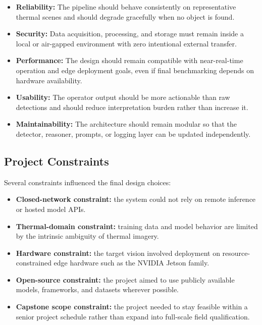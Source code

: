 \begin{itemize}[nosep]
  \item \textbf{Reliability:} The pipeline should behave consistently on representative
    thermal scenes and should degrade gracefully when no object is found.
  \item \textbf{Security:} Data acquisition, processing, and storage must remain inside a
    local or air-gapped environment with zero intentional external transfer.
  \item \textbf{Performance:} The design should remain compatible with near-real-time
    operation and edge deployment goals, even if final benchmarking depends on hardware
    availability.
  \item \textbf{Usability:} The operator output should be more actionable than raw
    detections and should reduce interpretation burden rather than increase it.
  \item \textbf{Maintainability:} The architecture should remain modular so that the
    detector, reasoner, prompts, or logging layer can be updated independently.
\end{itemize}

\subsection{Project Constraints}

Several constraints influenced the final design choices:

\begin{itemize}[nosep]
  \item \textbf{Closed-network constraint:} the system could not rely on remote inference or
    hosted model APIs.
  \item \textbf{Thermal-domain constraint:} training data and model behavior are limited by
    the intrinsic ambiguity of thermal imagery.
  \item \textbf{Hardware constraint:} the target vision involved deployment on resource-
    constrained edge hardware such as the NVIDIA Jetson family.
  \item \textbf{Open-source constraint:} the project aimed to use publicly available models,
    frameworks, and datasets wherever possible.
  \item \textbf{Capstone scope constraint:} the project needed to stay feasible within a senior
    project schedule rather than expand into full-scale field qualification.
\end{itemize}

